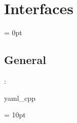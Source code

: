 
\section{Interfaces} 


\parskip = 0pt

\vspace{3mm} \subsection*{General}

: 

yaml\_cpp
\vspace{2mm}

\vspace{5mm}\parskip = 10pt 
